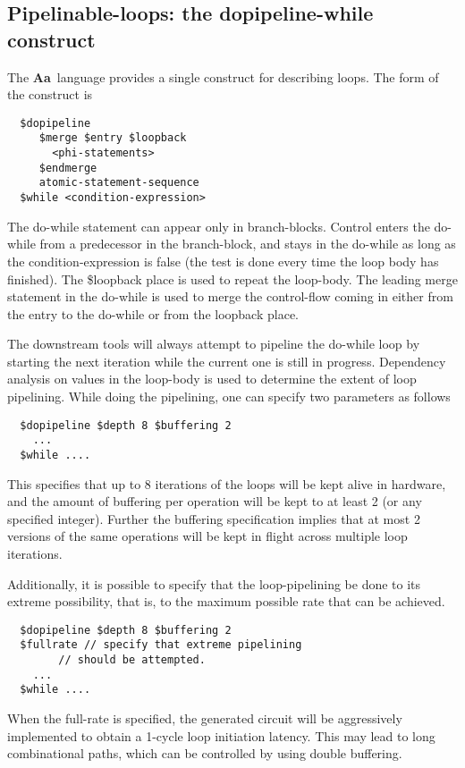 \documentclass{article}
\newcommand{\Aa}{{\bf Aa}~}
\begin{document}
\subsection{Pipelinable-loops: the {\bf dopipeline-while} construct}

The \Aa language provides a single construct for describing loops.
The form of the construct is
\begin{verbatim}
  $dopipeline
     $merge $entry $loopback
       <phi-statements>
     $endmerge
     atomic-statement-sequence
  $while <condition-expression>
\end{verbatim}
The do-while statement can appear only in branch-blocks.  Control enters
the do-while from a predecessor in the branch-block, and stays in the
do-while as long as the condition-expression is false (the test is done
every time the loop body has finished).  The \$loopback
place is used to repeat the loop-body.  The leading merge statement
in the do-while is used to merge the control-flow coming in either from
the entry to the do-while or from the loopback place.

The downstream tools will always attempt to pipeline the do-while loop by
starting the next iteration while the current one is still in progress.
Dependency analysis on values in the loop-body is used to determine the
extent of loop pipelining.  While doing the pipelining, one can specify
two parameters as follows
\begin{verbatim}
  $dopipeline $depth 8 $buffering 2
    ...
  $while ....
\end{verbatim}
This specifies that up to 8 iterations of the loops will be kept alive
in hardware, and the amount of buffering per operation will be kept to
at least 2 (or any specified integer).  Further the buffering specification implies that at most
2 versions of the same operations will be kept in flight across multiple
loop iterations.

Additionally, it is possible to specify that the loop-pipelining
be done to its extreme possibility, that is, to the maximum possible
rate that can be achieved.
\begin{verbatim}
  $dopipeline $depth 8 $buffering 2
  $fullrate // specify that extreme pipelining 
	    // should be attempted.
    ...
  $while ....
\end{verbatim}
When the full-rate is specified, the generated circuit will
be aggressively implemented to obtain a 1-cycle loop initiation
latency.  This may lead to long combinational paths, which can
be controlled by using double buffering.
\end{document}
